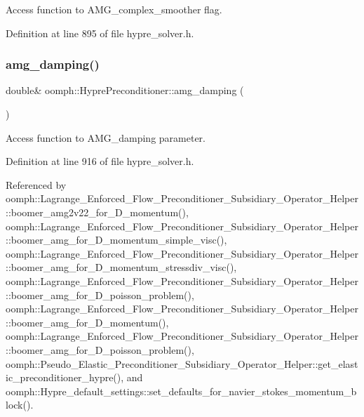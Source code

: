 Access function to A\+M\+G\+\_\+complex\+\_\+smoother flag. 



Definition at line 895 of file hypre\+\_\+solver.\+h.

\mbox{\label{classoomph_1_1HyprePreconditioner_a3abdca331efaf5b2998e1b2056c925eb}} 
\subsubsection{\texorpdfstring{amg\+\_\+damping()}{amg\_damping()}}
{\footnotesize\ttfamily double\& oomph\+::\+Hypre\+Preconditioner\+::amg\+\_\+damping (\begin{DoxyParamCaption}{ }\end{DoxyParamCaption})\hspace{0.3cm}{\ttfamily [inline]}}



Access function to A\+M\+G\+\_\+damping parameter. 



Definition at line 916 of file hypre\+\_\+solver.\+h.



Referenced by oomph\+::\+Lagrange\+\_\+\+Enforced\+\_\+\+Flow\+\_\+\+Preconditioner\+\_\+\+Subsidiary\+\_\+\+Operator\+\_\+\+Helper\+::boomer\+\_\+amg2v22\+\_\+for\+\_\+D\+\_\+momentum(), oomph\+::\+Lagrange\+\_\+\+Enforced\+\_\+\+Flow\+\_\+\+Preconditioner\+\_\+\+Subsidiary\+\_\+\+Operator\+\_\+\+Helper\+::boomer\+\_\+amg\+\_\+for\+\_\+D\+\_\+momentum\+\_\+simple\+\_\+visc(), oomph\+::\+Lagrange\+\_\+\+Enforced\+\_\+\+Flow\+\_\+\+Preconditioner\+\_\+\+Subsidiary\+\_\+\+Operator\+\_\+\+Helper\+::boomer\+\_\+amg\+\_\+for\+\_\+D\+\_\+momentum\+\_\+stressdiv\+\_\+visc(), oomph\+::\+Lagrange\+\_\+\+Enforced\+\_\+\+Flow\+\_\+\+Preconditioner\+\_\+\+Subsidiary\+\_\+\+Operator\+\_\+\+Helper\+::boomer\+\_\+amg\+\_\+for\+\_\+D\+\_\+poisson\+\_\+problem(), oomph\+::\+Lagrange\+\_\+\+Enforced\+\_\+\+Flow\+\_\+\+Preconditioner\+\_\+\+Subsidiary\+\_\+\+Operator\+\_\+\+Helper\+::boomer\+\_\+amg\+\_\+for\+\_\+D\+\_\+momentum(), oomph\+::\+Lagrange\+\_\+\+Enforced\+\_\+\+Flow\+\_\+\+Preconditioner\+\_\+\+Subsidiary\+\_\+\+Operator\+\_\+\+Helper\+::boomer\+\_\+amg\+\_\+for\+\_\+D\+\_\+poisson\+\_\+problem(), oomph\+::\+Pseudo\+\_\+\+Elastic\+\_\+\+Preconditioner\+\_\+\+Subsidiary\+\_\+\+Operator\+\_\+\+Helper\+::get\+\_\+elastic\+\_\+preconditioner\+\_\+hypre(), and oomph\+::\+Hypre\+\_\+default\+\_\+settings\+::set\+\_\+defaults\+\_\+for\+\_\+navier\+\_\+stokes\+\_\+momentum\+\_\+block().

